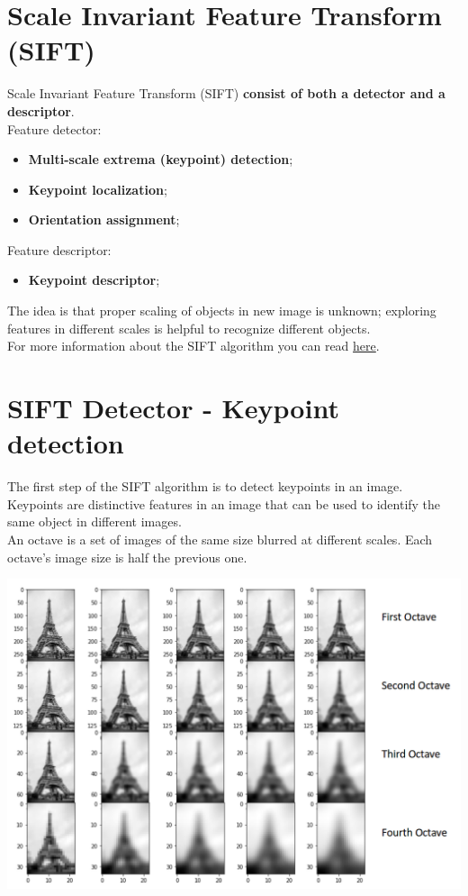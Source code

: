 \documentclass{article}
\begin{document}
\section*{Scale Invariant Feature Transform (SIFT)}

Scale Invariant Feature Transform (SIFT) \textbf{consist of both a detector and a descriptor}. \\

Feature detector:
\begin{itemize}
    \item \textbf{Multi-scale extrema (keypoint) detection};
    \item \textbf{Keypoint localization};
    \item \textbf{Orientation assignment};
\end{itemize}

Feature descriptor:
\begin{itemize}
    \item \textbf{Keypoint descriptor};
\end{itemize}

The idea is that proper scaling of objects in new image is unknown; exploring features in different scales is helpful to recognize different objects.\\

For more information about the SIFT algorithm you can read \href{https://medium.com/data-breach/introduction-to-sift-scale-invariant-feature-transform-65d7f3a72d40/}{here}.

\newpage

\section*{SIFT Detector - Keypoint detection}

The first step of the SIFT algorithm is to detect keypoints in an image. Keypoints are distinctive features in an image that can be used to identify the same object in different images. \\

An octave is a set of images of the same size blurred at different scales. Each octave's image size is half the previous one. 

\begin{center}
    \includegraphics[width=.9\linewidth]{images/octaves.png}
\end{center}
\end{document}
